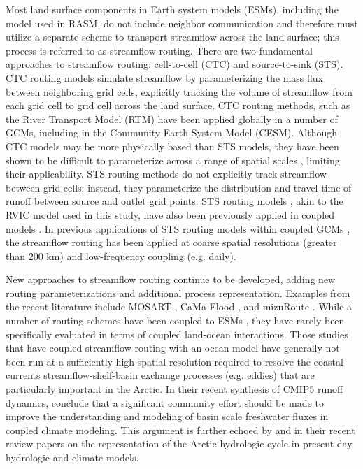 \documentclass[jgrga, draft]{agutex}
\begin{document}
\begin{article}
Most land surface components in Earth system models (ESMs), including the model used in RASM, do not include neighbor communication and therefore must utilize a separate scheme to transport streamflow across the land surface; this process is referred to as streamflow routing.
There are two fundamental approaches to streamflow routing: cell-to-cell (CTC) and source-to-sink (STS).
CTC routing models simulate streamflow by parameterizing the mass flux between neighboring grid cells, explicitly tracking the volume of streamflow from each grid cell to grid cell across the land surface.
CTC routing methods, such as the River Transport Model (RTM) \citep{Branstetter_2003} have been applied globally in a number of GCMs, including in the Community Earth System Model (CESM).
Although CTC models may be more physically based than STS models, they have been shown to be difficult to parameterize across a range of spatial scales \citep{Sushama_2004}, limiting their applicability.
STS routing methods do not explicitly track streamflow between grid cells; instead, they parameterize the distribution and travel time of runoff between source and outlet grid points.
STS routing models \citep[e.g.][]{Lohmann_1996,Naden_1992}, akin to the RVIC model used in this study, have also been previously applied in coupled models \citep[e.g.][]{Olivera_2000}.
In previous applications of STS routing models within coupled GCMs \citep[e.g.][]{Olivera_2000}, the streamflow routing has been applied at coarse spatial resolutions (greater than 200 km) and low-frequency coupling (e.g. daily).

New approaches to streamflow routing continue to be developed, adding new routing parameterizations and additional process representation.
Examples from the recent literature include MOSART \citep{Li_2013}, CaMa-Flood \citep{Yamazaki_2009,Yamazaki_2014}, and mizuRoute \citep{Clark_2016}.
While a number of routing schemes have been coupled to ESMs \citep[e.g.]{Sushama_2004,Olivera_2000,Li_2013}, they have rarely been specifically evaluated in terms of coupled land-ocean interactions.
Those studies that have coupled streamflow routing with an ocean model have generally not been run at a sufficiently high spatial resolution required to resolve the coastal currents streamflow-shelf-basin exchange processes (e.g. eddies) that are particularly important in the Arctic.
In their recent synthesis of CMIP5 runoff dynamics, \citet{Bring_2015} conclude that a significant community effort should be made to improve the understanding and modeling of basin scale freshwater fluxes in coupled climate modeling.
This argument is further echoed by \citet{Lique_2015} and \citet{Bring_2016} in their recent review papers on the representation of the Arctic hydrologic cycle in present-day hydrologic and climate models.


\end{article}
\end{document}
